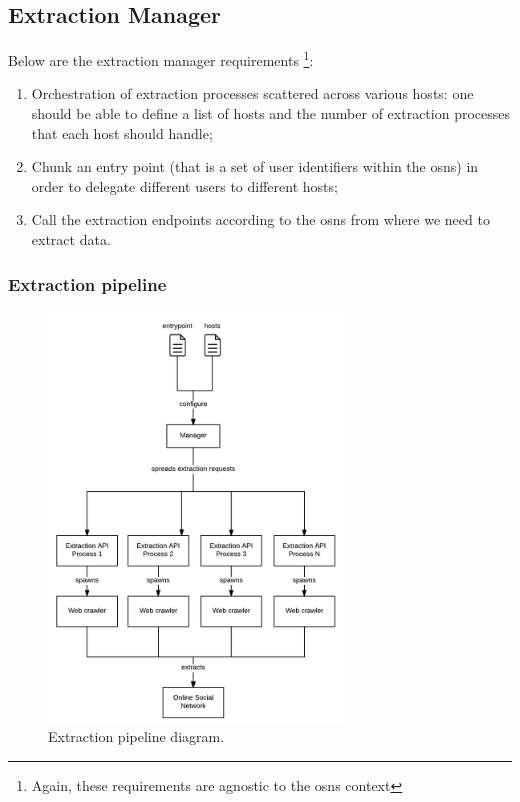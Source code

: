 \subsection{Extraction Manager}

Below are the extraction manager requirements \footnote{Again, these requirements are agnostic to the \glspl{osn} context}:

\begin{enumerate}
    \item Orchestration of extraction processes scattered across various hosts: one should be able to define a list of hosts and the number of extraction processes that each host should handle;
    \item Chunk an entry point (that is a set of user identifiers within the \glspl{osn}) in order to delegate different users to different hosts;
    \item Call the extraction endpoints according to the \glspl{osn} from where we need to extract data.
\end{enumerate}

\subsubsection{Extraction pipeline}

\begin{figure}[h!]
\begin{center}
  \includegraphics[width=0.7\textwidth]{img/ext-pipeline.png}
\end{center}
\caption{\label{img:extpipeline} Extraction pipeline diagram.}
\end{figure}

